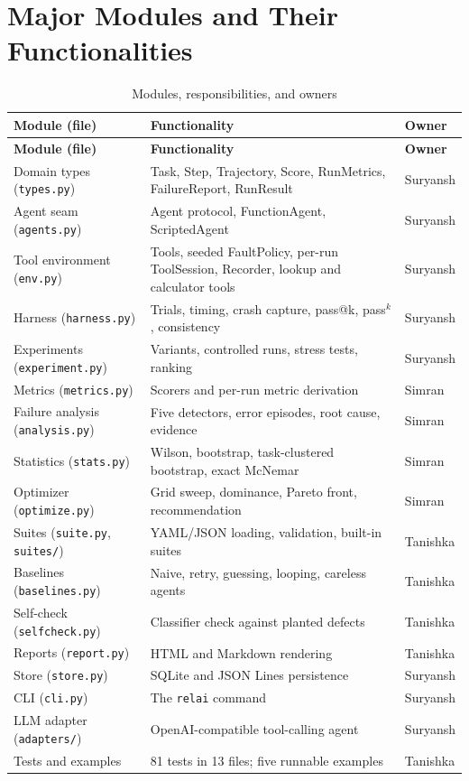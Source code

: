 \documentclass[12pt,a4paper,oneside]{report}
\begin{document}
\section{Major Modules and Their Functionalities}
\begin{longtable}{p{3.6cm}p{7.8cm}p{2.0cm}}
\caption{Modules, responsibilities, and owners}\\
\toprule
\textbf{Module (file)} & \textbf{Functionality} & \textbf{Owner} \\
\midrule
\endfirsthead
\toprule
\textbf{Module (file)} & \textbf{Functionality} & \textbf{Owner} \\
\midrule
\endhead
Domain types (\texttt{types.py}) & Task, Step, Trajectory, Score, RunMetrics, FailureReport, RunResult & Suryansh \\
Agent seam (\texttt{agents.py}) & Agent protocol, FunctionAgent, ScriptedAgent & Suryansh \\
Tool environment (\texttt{env.py}) & Tools, seeded FaultPolicy, per-run ToolSession, Recorder, lookup and calculator tools & Suryansh \\
Harness (\texttt{harness.py}) & Trials, timing, crash capture, pass@k, pass$^k$, consistency & Suryansh \\
Experiments (\texttt{experiment.py}) & Variants, controlled runs, stress tests, ranking & Suryansh \\
Metrics (\texttt{metrics.py}) & Scorers and per-run metric derivation & Simran \\
Failure analysis (\texttt{analysis.py}) & Five detectors, error episodes, root cause, evidence & Simran \\
Statistics (\texttt{stats.py}) & Wilson, bootstrap, task-clustered bootstrap, exact McNemar & Simran \\
Optimizer (\texttt{optimize.py}) & Grid sweep, dominance, Pareto front, recommendation & Simran \\
Suites (\texttt{suite.py}, \texttt{suites/}) & YAML/JSON loading, validation, built-in suites & Tanishka \\
Baselines (\texttt{baselines.py}) & Naive, retry, guessing, looping, careless agents & Tanishka \\
Self-check (\texttt{selfcheck.py}) & Classifier check against planted defects & Tanishka \\
Reports (\texttt{report.py}) & HTML and Markdown rendering & Tanishka \\
Store (\texttt{store.py}) & SQLite and JSON Lines persistence & Suryansh \\
CLI (\texttt{cli.py}) & The \texttt{relai} command & Suryansh \\
LLM adapter (\texttt{adapters/}) & OpenAI-compatible tool-calling agent & Suryansh \\
Tests and examples & 81 tests in 13 files; five runnable examples & Tanishka \\
\bottomrule
\end{longtable}
\end{document}
